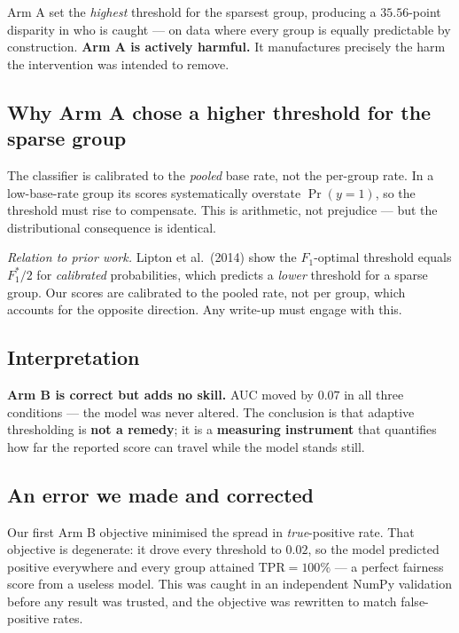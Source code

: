 \documentclass[11pt,a4paper]{article}
\newcommand{\verdictgood}[1]{\textcolor{dkgreen}{\textbf{#1}}}
\newcommand{\verdictbad}[1]{\textcolor{dkred}{\textbf{#1}}}
\begin{document}
\noindent Arm A set the \emph{highest} threshold for the sparsest group,
producing a $35.56$-point disparity in who is caught --- on data where every
group is equally predictable by construction.
\verdictbad{Arm A is actively harmful.} It manufactures precisely the harm the
intervention was intended to remove.

\subsection{Why Arm A chose a higher threshold for the sparse group}
The classifier is calibrated to the \emph{pooled} base rate, not the per-group
rate. In a low-base-rate group its scores systematically overstate
$\Pr(y=1)$, so the threshold must rise to compensate. This is arithmetic, not
prejudice --- but the distributional consequence is identical.

\medskip
\noindent \emph{Relation to prior work.} Lipton et al.\ (2014)
\cite{lipton2014} show the $F_1$-optimal threshold equals $F_1^*/2$ for
\emph{calibrated} probabilities, which predicts a \emph{lower} threshold for a
sparse group. Our scores are calibrated to the pooled rate, not per group, which
accounts for the opposite direction. Any write-up must engage with this.

\subsection{Interpretation}
\verdictgood{Arm B is correct but adds no skill.} AUC moved by $0.07$ in all
three conditions --- the model was never altered. The conclusion is that
adaptive thresholding is \textbf{not a remedy}; it is a \textbf{measuring
instrument} that quantifies how far the reported score can travel while the
model stands still.

\subsection{An error we made and corrected}
Our first Arm B objective minimised the spread in \emph{true}-positive rate.
That objective is degenerate: it drove every threshold to $0.02$, so the model
predicted positive everywhere and every group attained $\mathrm{TPR} = 100\%$
--- a perfect fairness score from a useless model. This was caught in an
independent NumPy validation before any result was trusted, and the objective
was rewritten to match false-positive rates.

\end{document}
